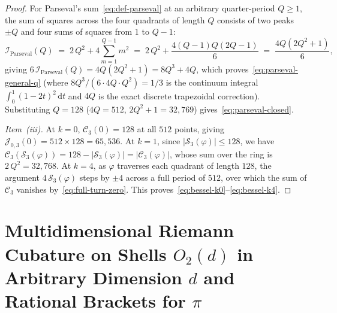 \documentclass[11pt,a4paper]{article}
\theoremstyle{plain}
\theoremstyle{definition}
\begin{document}
\begin{proof}
For Parseval's sum~\eqref{eq:def-parseval} at an arbitrary quarter-period $Q \ge 1$, the sum of squares across the four quadrants of length $Q$ consists of two peaks $\pm Q$ and four sums of squares from $1$ to $Q - 1$:
\begin{equation*}
  \mathcal{I}_{\mathrm{Parseval}}(Q) \;=\; 2\,Q^2 + 4\sum_{m=1}^{Q-1} m^2 \;=\; 2\,Q^2 + \frac{4(Q - 1)Q(2Q - 1)}{6} \;=\; \frac{4Q(2Q^2 + 1)}{6},
\end{equation*}
giving $6\,\mathcal{I}_{\mathrm{Parseval}}(Q) = 4Q(2Q^2 + 1) = 8Q^3 + 4Q$, which proves~\eqref{eq:parseval-general-q} (where $8Q^3 / (6\cdot 4Q\cdot Q^2) = 1/3$ is the continuum integral $\int_0^1 (1-2t)^2\,\mathrm{d}t$ and $4Q$ is the exact discrete trapezoidal correction). Substituting $Q = 128$ ($4Q = 512$, $2Q^2 + 1 = 32,769$) gives~\eqref{eq:parseval-closed}.

\emph{Item~(iii).} At $k = 0$, $\mathcal{C}_3(0) = 128$ at all $512$ points, giving $\mathcal{J}_{0,3}(0) = 512 \times 128 = 65,536$. At $k = 1$, since $|\mathcal{S}_3(\varphi)| \le 128$, we have $\mathcal{C}_3(\mathcal{S}_3(\varphi)) = 128 - |\mathcal{S}_3(\varphi)| = |\mathcal{C}_3(\varphi)|$, whose sum over the ring is $2\,Q^2 = 32,768$. At $k = 4$, as $\varphi$ traverses each quadrant of length $128$, the argument $4\,\mathcal{S}_3(\varphi)$ steps by $\pm 4$ across a full period of $512$, over which the sum of $\mathcal{C}_3$ vanishes by~\eqref{eq:full-turn-zero}. This proves~\eqref{eq:bessel-k0}--\eqref{eq:bessel-k4}.
\end{proof}

\section{Multidimensional Riemann Cubature on Shells \texorpdfstring{$O_2(d)$}{O2(d)} in Arbitrary Dimension \texorpdfstring{$d$}{d} and Rational Brackets for \texorpdfstring{$\pi$}{pi}}
\label{sec:continuum-emergence}
\end{document}
